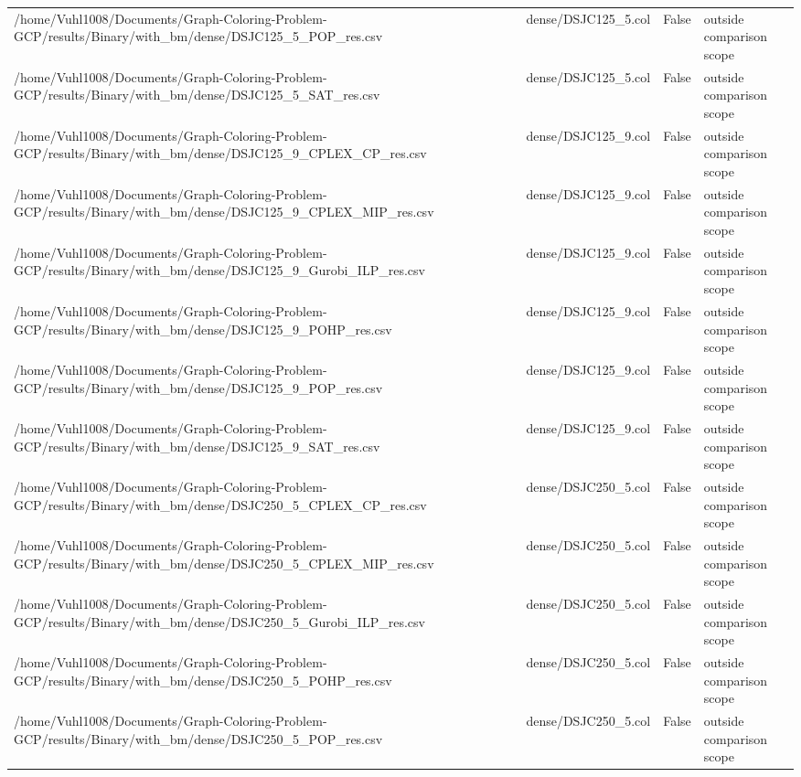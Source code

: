 \begin{table}[htbp]
\begin{tabular}{llll}
/home/Vuhl1008/Documents/Graph-Coloring-Problem-GCP/results/Binary/with\_bm/dense/DSJC125\_5\_POP\_res.csv & dense/DSJC125\_5.col & False & outside comparison scope \\
/home/Vuhl1008/Documents/Graph-Coloring-Problem-GCP/results/Binary/with\_bm/dense/DSJC125\_5\_SAT\_res.csv & dense/DSJC125\_5.col & False & outside comparison scope \\
/home/Vuhl1008/Documents/Graph-Coloring-Problem-GCP/results/Binary/with\_bm/dense/DSJC125\_9\_CPLEX\_CP\_res.csv & dense/DSJC125\_9.col & False & outside comparison scope \\
/home/Vuhl1008/Documents/Graph-Coloring-Problem-GCP/results/Binary/with\_bm/dense/DSJC125\_9\_CPLEX\_MIP\_res.csv & dense/DSJC125\_9.col & False & outside comparison scope \\
/home/Vuhl1008/Documents/Graph-Coloring-Problem-GCP/results/Binary/with\_bm/dense/DSJC125\_9\_Gurobi\_ILP\_res.csv & dense/DSJC125\_9.col & False & outside comparison scope \\
/home/Vuhl1008/Documents/Graph-Coloring-Problem-GCP/results/Binary/with\_bm/dense/DSJC125\_9\_POHP\_res.csv & dense/DSJC125\_9.col & False & outside comparison scope \\
/home/Vuhl1008/Documents/Graph-Coloring-Problem-GCP/results/Binary/with\_bm/dense/DSJC125\_9\_POP\_res.csv & dense/DSJC125\_9.col & False & outside comparison scope \\
/home/Vuhl1008/Documents/Graph-Coloring-Problem-GCP/results/Binary/with\_bm/dense/DSJC125\_9\_SAT\_res.csv & dense/DSJC125\_9.col & False & outside comparison scope \\
/home/Vuhl1008/Documents/Graph-Coloring-Problem-GCP/results/Binary/with\_bm/dense/DSJC250\_5\_CPLEX\_CP\_res.csv & dense/DSJC250\_5.col & False & outside comparison scope \\
/home/Vuhl1008/Documents/Graph-Coloring-Problem-GCP/results/Binary/with\_bm/dense/DSJC250\_5\_CPLEX\_MIP\_res.csv & dense/DSJC250\_5.col & False & outside comparison scope \\
/home/Vuhl1008/Documents/Graph-Coloring-Problem-GCP/results/Binary/with\_bm/dense/DSJC250\_5\_Gurobi\_ILP\_res.csv & dense/DSJC250\_5.col & False & outside comparison scope \\
/home/Vuhl1008/Documents/Graph-Coloring-Problem-GCP/results/Binary/with\_bm/dense/DSJC250\_5\_POHP\_res.csv & dense/DSJC250\_5.col & False & outside comparison scope \\
/home/Vuhl1008/Documents/Graph-Coloring-Problem-GCP/results/Binary/with\_bm/dense/DSJC250\_5\_POP\_res.csv & dense/DSJC250\_5.col & False & outside comparison scope \\

\end{tabular}
\end{table}
